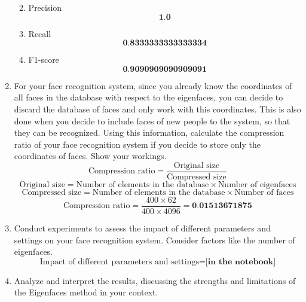\documentclass[12pt]{extarticle} %
\begin{document}
\begin{enumerate}
\begin{enumerate}
\[        \]
        \item Precision
        \[
            \textbf{1.0}
        \]
        \item Recall
        \[
            \textbf{0.8333333333333334}
        \]
        \item F1-score
        \[
        \textbf{0.9090909090909091}
        \]
    \end{enumerate}
    \item For your face recognition system, since you already know the coordinates of all faces in the database
    with respect to the eigenfaces, you can decide to discard the database of faces and only work with this
    coordinates. This is also done when you decide to include faces of new people to the system, so that
    they can be recognized. Using this information, calculate the compression ratio of your face recognition
    system if you decide to store only the coordinates of faces. Show your workings.
    \[
    \text{Compression ratio} = \frac{\text{Original size}}{\text{Compressed size}}
    \]
    \[
    \text{Original size} = \text{Number of elements in the database} \times \text{Number of eigenfaces}
    \]
    \[
    \text{Compressed size} = \text{Number of elements in the database} \times \text{Number of faces}
    \]
    \[
    \text{Compression ratio} = \frac{400 \times 62}{400 \times 4096} = \textbf{0.01513671875}
    \]
    \item Conduct experiments to assess the impact of different parameters and settings on your face recognition
    system. Consider factors like the number of eigenfaces.
    \[
    \text{Impact of different parameters and settings} = \textbf{[in the notebook]}
    \]
    \item Analyze and interpret the results, discussing the strengths and limitations of the Eigenfaces method
    in your context.

    \\ 
\end{enumerate}
\end{document}
